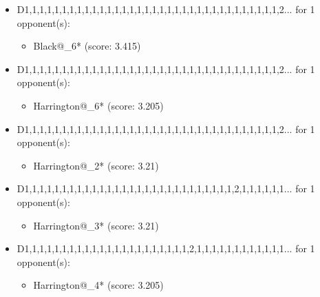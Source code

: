 \begin{appendices}
\begin{itemize}
    \item D1,1,1,1,1,1,1,1,1,1,1,1,1,1,1,1,1,1,1,1,1,1,1,1,1,1,1,1,1,1,1,1,1,1,2... for 1 opponent(s):
    \begin{multicols}{3}
         \begin{itemize}
            \item Black@\_6* (score: 3.415)
        \end{itemize}
     \end{multicols}
     
    \item D1,1,1,1,1,1,1,1,1,1,1,1,1,1,1,1,1,1,1,1,1,1,1,1,1,1,1,1,1,1,1,1,1,1,2... for 1 opponent(s):
    \begin{multicols}{3}
         \begin{itemize}
            \item Harrington@\_6* (score: 3.205)
        \end{itemize}
     \end{multicols}
     
    \item D1,1,1,1,1,1,1,1,1,1,1,1,1,1,1,1,1,1,1,1,1,1,1,1,1,1,1,1,1,1,1,1,1,1,2... for 1 opponent(s):
    \begin{multicols}{3}
         \begin{itemize}
            \item Harrington@\_2* (score: 3.21)
        \end{itemize}
     \end{multicols}
     
    \item D1,1,1,1,1,1,1,1,1,1,1,1,1,1,1,1,1,1,1,1,1,1,1,1,1,1,1,1,2,1,1,1,1,1,1... for 1 opponent(s):
    \begin{multicols}{3}
         \begin{itemize}
            \item Harrington@\_3* (score: 3.21)
        \end{itemize}
     \end{multicols}
     
    \item D1,1,1,1,1,1,1,1,1,1,1,1,1,1,1,1,1,1,1,1,1,1,2,1,1,1,1,1,1,1,1,1,1,1,1... for 1 opponent(s):
    \begin{multicols}{3}
         \begin{itemize}
            \item Harrington@\_4* (score: 3.205)
        \end{itemize}
     \end{multicols}
     

\end{itemize}
\end{appendices}
